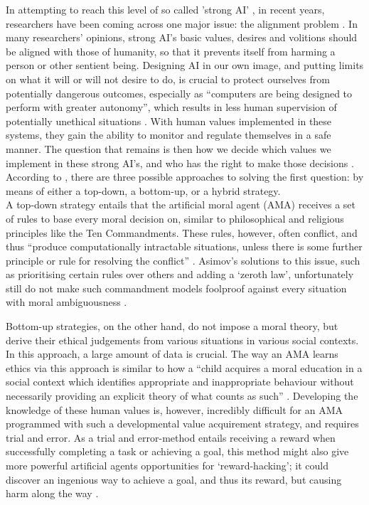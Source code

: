 \documentclass[final]{clv3} %
\begin{document}
In attempting to reach this level of so called 'strong AI' \cite{chineseroom}, in recent years, researchers have been coming across one major issue: the alignment problem \cite{russell}. In many researchers’ opinions, strong AI’s basic values, desires and volitions should be aligned with those of humanity, so that it prevents itself from harming a person or other sentient being. Designing AI in our own image, and putting limits on what it will or will not desire to do, is crucial to protect ourselves from potentially dangerous outcomes, especially as “computers are being designed to perform with greater autonomy”, which results in less human supervision of potentially unethical situations \cite[p. 149]{allen2005}. With human values implemented in these systems, they gain the ability to monitor and regulate themselves in a safe manner. The question that remains is then how we decide which values we implement in these strong AI’s, and who has the right to make those decisions \cite{gabriel}. According to \citet{allen2005}, there are three possible approaches to solving the first question: by means of either a top-down, a bottom-up, or a hybrid strategy.\\

A top-down strategy entails that the artificial moral agent (AMA) receives a set of rules to base every moral decision on, similar to philosophical and religious principles like the Ten Commandments. These rules, however, often conflict, and thus “produce computationally intractable situations, unless there is some further principle or rule for resolving the conflict” \cite[p. 149]{allen2005}. Asimov’s solutions to this issue, such as prioritising certain rules over others and adding a ‘zeroth law’, unfortunately still do not make such commandment models foolproof against every situation with moral ambiguousness \cite{allen2005}.

Bottom-up strategies, on the other hand, do not impose a moral theory, but derive their ethical judgements from various situations in various social contexts. In this approach, a large amount of data is crucial. The way an AMA learns ethics via this approach is similar to how a “child acquires a moral education in a social context which identifies appropriate and inappropriate behaviour without necessarily providing an explicit theory of what counts as such” \cite[p. 151]{allen2005}. Developing the knowledge of these human values is, however, incredibly difficult for an AMA programmed with such a developmental value acquirement strategy, and requires trial and error. As a trial and error-method entails receiving a reward when successfully completing a task or achieving a goal, this method might also give more powerful artificial agents opportunities for ‘reward-hacking’; it could discover an ingenious way to achieve a goal, and thus its reward, but causing harm along the way \cite{gabriel}. \\
\end{document}
